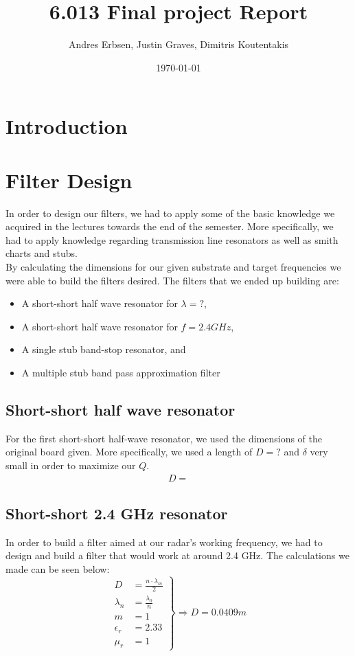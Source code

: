 \documentclass[letterpaper, 12pt]{article}
\begin{document}
\title{6.013 Final project Report}
\author{Andres Erbsen, Justin Graves, Dimitris Koutentakis}
\date{\today}
\maketitle
\vspace{5mm}
\tableofcontents
\clearpage
\section{Introduction}
\section{Filter Design}
In order to design our filters, we had to apply some of the basic knowledge we acquired in the lectures towards the end of the semester. More specifically, we had to apply knowledge regarding transmission line resonators as well as smith charts and stubs.
\\
By calculating the dimensions for our given substrate and target frequencies we were able to build the filters desired. The filters that we ended up building are:
\begin{itemize}
    \item A short-short half wave resonator for $\lambda=?$,
    \item A short-short half wave resonator for $f=2.4 GHz$,
    \item A single stub band-stop resonator, and
    \item A multiple stub band pass approximation filter
\end{itemize}
\subsection{Short-short half wave resonator}
For the first short-short half-wave resonator, we used the dimensions of the original board given. More specifically, we used a length of $D=?$ and $\delta$ very small in order to maximize our $Q$. 
\begin{align*}
    D=
\end{align*}
\subsection{Short-short 2.4 GHz resonator}
In order to build a filter aimed at our radar's working frequency, we had to design and build a filter that would work at around 2.4 GHz. The calculations we made can be seen below:
\begin{equation*}
\left.
\begin{aligned}
    D&=\frac{n\cdot\lambda_m}{2} \\
    \lambda_n&=\frac{\lambda_0}{n}\\
    m&=1 \\
    \epsilon_r&=2.33 \\
    \mu_r&=1
\end{aligned}
\right \}
\Longrightarrow
D=0.0409m
\end{equation*}
\end{document}
